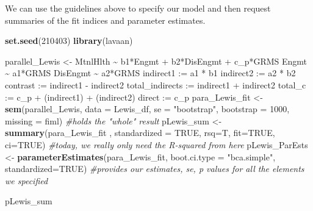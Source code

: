 \documentclass[
  11pt,
]{book}
\newenvironment{Shaded}{\begin{snugshade}}{\end{snugshade}}
\newcommand{\AttributeTok}[1]{\textcolor[rgb]{0.27,0.27,0.27}{#1}}
\newcommand{\CommentTok}[1]{\textcolor[rgb]{0.37,0.37,0.37}{\textit{#1}}}
\newcommand{\ConstantTok}[1]{\textcolor[rgb]{0.37,0.37,0.37}{#1}}
\newcommand{\DecValTok}[1]{\textcolor[rgb]{0.06,0.06,0.06}{#1}}
\newcommand{\FunctionTok}[1]{\textcolor[rgb]{0.27,0.27,0.27}{\textbf{#1}}}
\newcommand{\NormalTok}[1]{#1}
\newcommand{\OtherTok}[1]{\textcolor[rgb]{0.37,0.37,0.37}{#1}}
\newcommand{\StringTok}[1]{\textcolor[rgb]{0.5,0.5,0.5}{#1}}
\begin{document}
We can use the guidelines above to specify our model and then request summaries of the fit indices and parameter estimates.

\begin{Shaded}
\begin{Highlighting}[]
\FunctionTok{set.seed}\NormalTok{(}\DecValTok{210403}\NormalTok{)}
\FunctionTok{library}\NormalTok{(lavaan)}

\NormalTok{parallel\_Lewis }\OtherTok{\textless{}{-}} \StringTok{\textquotesingle{}}
\StringTok{    MtnlHlth \textasciitilde{} b1*Engmt + b2*DisEngmt + c\_p*GRMS}
\StringTok{    Engmt \textasciitilde{} a1*GRMS    }
\StringTok{    DisEngmt \textasciitilde{} a2*GRMS}
\StringTok{    indirect1 := a1 * b1}
\StringTok{    indirect2 := a2 * b2}
\StringTok{    contrast := indirect1 {-} indirect2}
\StringTok{    total\_indirects := indirect1 + indirect2}
\StringTok{    total\_c := c\_p + (indirect1) + (indirect2)}
\StringTok{    direct := c\_p}
\StringTok{\textquotesingle{}}
\NormalTok{para\_Lewis\_fit }\OtherTok{\textless{}{-}} \FunctionTok{sem}\NormalTok{(parallel\_Lewis, }\AttributeTok{data =}\NormalTok{ Lewis\_df, }\AttributeTok{se =} \StringTok{"bootstrap"}\NormalTok{, }\AttributeTok{bootstrap =} \DecValTok{1000}\NormalTok{, }\AttributeTok{missing =} \StringTok{\textquotesingle{}fiml\textquotesingle{}}\NormalTok{) }\CommentTok{\#holds the "whole" result}
\NormalTok{pLewis\_sum }\OtherTok{\textless{}{-}} \FunctionTok{summary}\NormalTok{(para\_Lewis\_fit , }\AttributeTok{standardized =} \ConstantTok{TRUE}\NormalTok{, }\AttributeTok{rsq=}\NormalTok{T, }\AttributeTok{fit=}\ConstantTok{TRUE}\NormalTok{, }\AttributeTok{ci=}\ConstantTok{TRUE}\NormalTok{) }\CommentTok{\#today, we really only need the R{-}squared from here    }
\NormalTok{pLewis\_ParEsts }\OtherTok{\textless{}{-}} \FunctionTok{parameterEstimates}\NormalTok{(para\_Lewis\_fit, }\AttributeTok{boot.ci.type =} \StringTok{"bca.simple"}\NormalTok{, }\AttributeTok{standardized=}\ConstantTok{TRUE}\NormalTok{) }\CommentTok{\#provides our estimates, se, p values for all the elements we specified}
\end{Highlighting}
\end{Shaded}

\begin{Shaded}
\begin{Highlighting}[]
\NormalTok{pLewis\_sum}
\end{Highlighting}
\end{Shaded}
\end{document}
